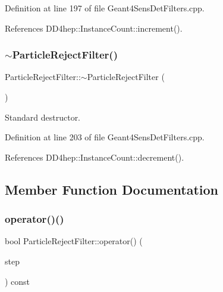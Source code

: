 Definition at line 197 of file Geant4\+Sens\+Det\+Filters.\+cpp.



References D\+D4hep\+::\+Instance\+Count\+::increment().

\hypertarget{struct_d_d4hep_1_1_simulation_1_1_particle_reject_filter_a3e870813c0699826fd9e01deab351ba8}{}\label{struct_d_d4hep_1_1_simulation_1_1_particle_reject_filter_a3e870813c0699826fd9e01deab351ba8} 
\subsubsection{\texorpdfstring{$\sim$\+Particle\+Reject\+Filter()}{~ParticleRejectFilter()}}
{\footnotesize\ttfamily Particle\+Reject\+Filter\+::$\sim$\+Particle\+Reject\+Filter (\begin{DoxyParamCaption}{ }\end{DoxyParamCaption})\hspace{0.3cm}{\ttfamily [virtual]}}



Standard destructor. 



Definition at line 203 of file Geant4\+Sens\+Det\+Filters.\+cpp.



References D\+D4hep\+::\+Instance\+Count\+::decrement().



\subsection{Member Function Documentation}
\hypertarget{struct_d_d4hep_1_1_simulation_1_1_particle_reject_filter_a3bf0977c00e9d94b45a1c2e0cb47448d}{}\label{struct_d_d4hep_1_1_simulation_1_1_particle_reject_filter_a3bf0977c00e9d94b45a1c2e0cb47448d} 
\subsubsection{\texorpdfstring{operator()()}{operator()()}}
{\footnotesize\ttfamily bool Particle\+Reject\+Filter\+::operator() (\begin{DoxyParamCaption}\item[{const G4\+Step $\ast$}]{step }\end{DoxyParamCaption}) const\hspace{0.3cm}{\ttfamily [virtual]}}



